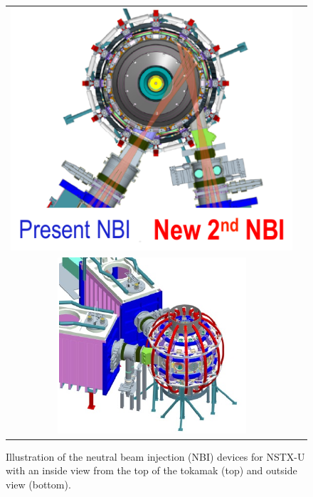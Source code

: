\documentclass{iopart}
\begin{document}
\begin{figure}
\begin{tabular}{cc}
\includegraphics[width=\linewidth]{imene_figs/fig3a} \\
\includegraphics[width=\linewidth]{imene_figs/fig3b}
\end{tabular}
\caption{Illustration of the neutral beam injection (NBI) devices for NSTX-U with an inside view from the top of the tokamak (top) and outside view (bottom).}
\label{NBI_pics}
\end{figure}
\end{document}
